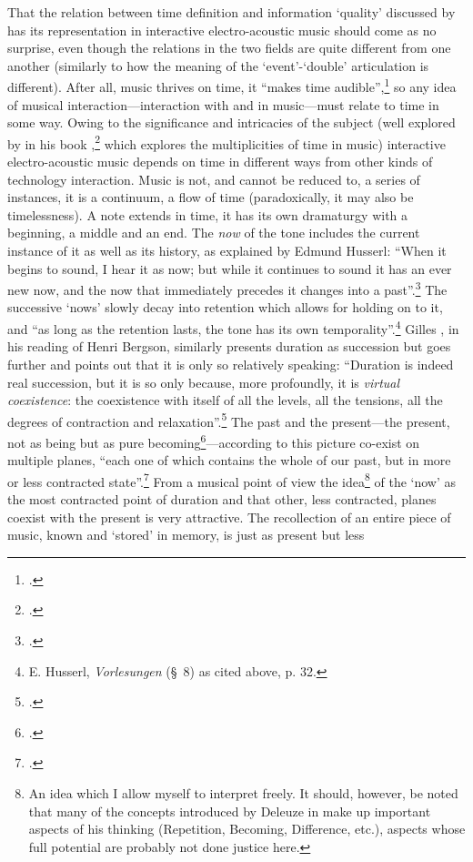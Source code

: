 That the relation between time definition and information `quality' discussed by \citeauthor{baudrillard96} has its representation in interactive electro-acoustic music should come as no surprise, even though the relations in the two fields are quite different from one another (similarly to how the meaning  of the `event'-`double' articulation is different). After all, music thrives on time, it ``makes time audible'',\footcite[From \emph{Feeling and form} by Susanne Langer as quoted in][1]{kramer88} so any idea of musical interaction---interaction with and in music---must relate to time in some way. Owing to the significance and intricacies of the subject (well explored by \citeauthor{kramer88} in his book ,\footcite{kramer88} which explores the multiplicities of time in music) interactive electro-acoustic music depends on time in different ways from other kinds of technology interaction. Music is not, and cannot be reduced to, a series of instances, it is a continuum, a flow of time (paradoxically, it may also be timelessness). A note extends in time, it has its own dramaturgy with a beginning, a middle and an end. The \emph{now} of the tone includes the current instance of it as well as its history, as explained by Edmund Husserl: ``When it begins to sound, I hear it as now; but while it continues to sound it has an ever new now, and the now that immediately precedes it changes into a past''.\footcite[E. Husserl, \emph{Vorlesungen zur Ph{\"a}nomenologie des inneren Zeitbewusstseins} (\S~7) as cited in][32]{ricoeur04} The successive `nows' slowly decay into retention which allows for holding on to it, and ``as long as the retention lasts, the tone has its own temporality''.\footnote{E. Husserl, \emph{Vorlesungen} (\S~8) as cited above, p. 32.} \hypertarget{par:human-comp-inter:11}{Gilles} \citeauthor{deleuze88}, in his reading of Henri Bergson, similarly presents duration as succession but goes further and points out that it is only so relatively speaking: ``Duration is indeed real succession, but it is so only because, more profoundly, it is \emph{virtual coexistence}: the coexistence with itself of all the levels, all the tensions, all the degrees of contraction and relaxation''.\footcite[60]{deleuze88} The past and the present---the present, not as being but as pure becoming\footcite[Deleuze writes that ``present, the form under which being is consummated and places itself outside of itself''.][55]{deleuze88}---according to this picture co-exist on multiple planes, ``each one of which contains the whole of our past, but in more or less contracted state''.\footcite[61]{deleuze88} From a musical point of view the idea\footnote{An idea which I allow myself to interpret freely. It should, however, be noted that many of the concepts introduced by Deleuze in  make up important aspects of his thinking (Repetition, Becoming, Difference, etc.), aspects whose full potential are probably not done justice here.} of the `now' as the most contracted point of duration and that other, less contracted, planes coexist with the present is very attractive. The recollection of an entire piece of music, known and `stored' in memory, is just as present but less 